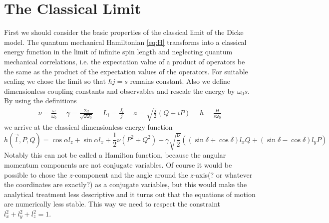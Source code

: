 \section{The Classical Limit}\label{ch:ClassLim}
First we should consider the basic properties of the classical limit of the Dicke model.
The quantum mechanical Hamiltonian \eqref{eq:H} transforms into a classical energy function in the limit of infinite spin length and neglecting quantum mechanical correlations, i.e. the expectation value of a product of operators be the same as the product of the expectation values of the operators.
For suitable scaling we chose the limit so that $\hbar j = s$ remains constant.
Also we define dimensionless coupling constants and observables and rescale the energy by $\omega_0 s$.
By using the definitions
\begin{align}
\nu = \frac{\omega}{\omega_0} ~~~~~~ \gamma = \frac{2 g}{\sqrt{\omega \omega_0}} ~~~~~~ L_i = \frac{J_i}{j} ~~~~~~ a =\sqrt{\frac{j}{2}}(Q+iP)~~~~~~ h =\frac{H}{s\omega_0}
\end{align}
we arrive at the classical dimensionless energy function
\begin{equation}
h(\vec{l}, P,Q) = \cos\alpha l_z + \sin\alpha l_x + \frac 12 \nu (P^2 + Q^2) + \gamma \sqrt{\frac \nu 2}\left( \left( \sin\delta + \cos\delta\right) l_x Q + \left( \sin\delta - \cos \delta \right) l_y P  \right) \label{eq:h}
\end{equation}
Notably this can not be called a Hamilton function, because the angular momentum components are not conjugate variables. Of course it would be possible to chose the $z$-component and the angle around the $z$-axis(? or whatever the coordinates are exactly?) as a conjugate variables, but this would make the analytical treatment less descriptive and it turns out that the equations of motion are numerically less stable. This way we need to respect the constraint $l_x^2 + l_y^2 + l_z^2 = 1$.

